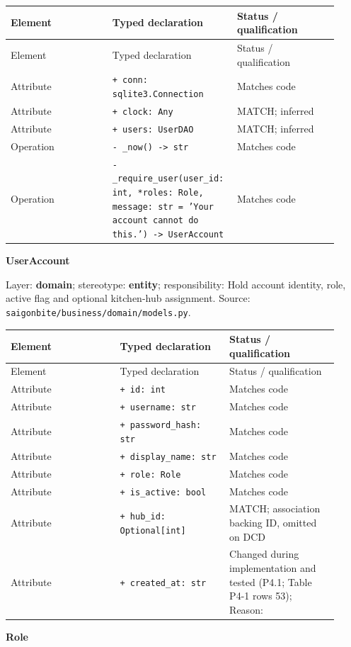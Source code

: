\begin{longtable}{>{\raggedright\arraybackslash}p{0.3067\linewidth}>{\raggedright\arraybackslash}p{0.3067\linewidth}>{\raggedright\arraybackslash}p{0.3067\linewidth}}
Element & Typed declaration & Status / qualification \\
\hline\endfirsthead
Element & Typed declaration & Status / qualification \\
\hline\endhead
Attribute & \texttt{+ conn: sqlite3.\allowbreak{}Connection} & Matches code \\
Attribute & \texttt{+ clock: Any} & MATCH; inferred \\
Attribute & \texttt{+ users: UserDAO} & MATCH; inferred \\
Operation & \texttt{- \_\allowbreak{}now() -\textgreater{} str} & Matches code \\
Operation & \texttt{- \_\allowbreak{}require\_\allowbreak{}user(user\_\allowbreak{}id: int, *roles: Role, message: str = 'Your account cannot do this.\allowbreak{}') -\textgreater{} UserAccount} & Matches code \\
\end{longtable}
\textbf{UserAccount}

Layer: \textbf{domain}; stereotype: \textbf{\guillemotleft{}entity\guillemotright{}}; responsibility: Hold account identity, role, active flag and optional kitchen-hub assignment. Source: \texttt{saigonbite/\allowbreak{}business/\allowbreak{}domain/\allowbreak{}models.\allowbreak{}py}.

\begin{longtable}{>{\raggedright\arraybackslash}p{0.3067\linewidth}>{\raggedright\arraybackslash}p{0.3067\linewidth}>{\raggedright\arraybackslash}p{0.3067\linewidth}}
Element & Typed declaration & Status / qualification \\
\hline\endfirsthead
Element & Typed declaration & Status / qualification \\
\hline\endhead
Attribute & \texttt{+ id: int} & Matches code \\
Attribute & \texttt{+ username: str} & Matches code \\
Attribute & \texttt{+ password\_\allowbreak{}hash: str} & Matches code \\
Attribute & \texttt{+ display\_\allowbreak{}name: str} & Matches code \\
Attribute & \texttt{+ role: Role} & Matches code \\
Attribute & \texttt{+ is\_\allowbreak{}active: bool} & Matches code \\
Attribute & \texttt{+ hub\_\allowbreak{}id: Optional[int]} & MATCH; association backing ID, omitted on DCD \\
Attribute & \texttt{+ created\_\allowbreak{}at: str} & Changed during implementation and tested (P4.1; Table P4-1 rows 53); Reason: \\
\end{longtable}
\textbf{Role}

